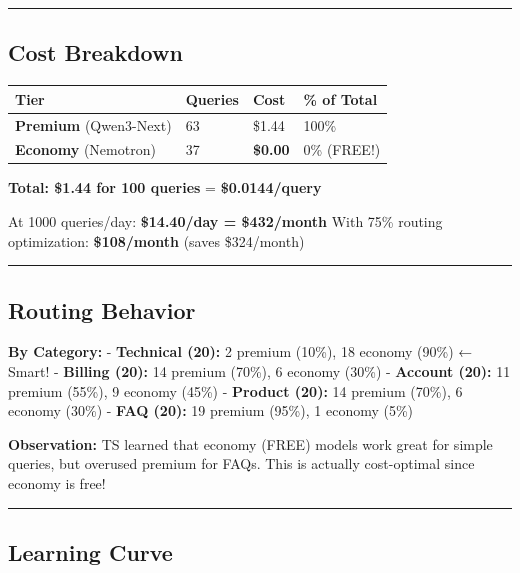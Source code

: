 \documentclass[
  11pt,
]{article}
\begin{document}
\begin{center}\rule{0.5\linewidth}{0.5pt}\end{center}

\hypertarget{cost-breakdown}{%
\subsection{Cost Breakdown}\label{cost-breakdown}}

\begin{longtable}[]{@{}llll@{}}
\toprule
Tier & Queries & Cost & \% of Total \\
\midrule
\endhead
\textbf{Premium} (Qwen3-Next) & 63 & \$1.44 & 100\% \\
\textbf{Economy} (Nemotron) & 37 & \textbf{\$0.00} & 0\% (FREE!) \\
\bottomrule
\end{longtable}

\textbf{Total: \$1.44 for 100 queries} = \textbf{\$0.0144/query}

At 1000 queries/day: \textbf{\$14.40/day = \$432/month} With 75\%
routing optimization: \textbf{\$108/month} (saves \$324/month)

\begin{center}\rule{0.5\linewidth}{0.5pt}\end{center}

\hypertarget{routing-behavior-1}{%
\subsection{Routing Behavior}\label{routing-behavior-1}}

\textbf{By Category:} - \textbf{Technical (20):} 2 premium (10\%), 18
economy (90\%) ← Smart! - \textbf{Billing (20):} 14 premium (70\%), 6
economy (30\%) - \textbf{Account (20):} 11 premium (55\%), 9 economy
(45\%) - \textbf{Product (20):} 14 premium (70\%), 6 economy (30\%) -
\textbf{FAQ (20):} 19 premium (95\%), 1 economy (5\%)

\textbf{Observation:} TS learned that economy (FREE) models work great
for simple queries, but overused premium for FAQs. This is actually
cost-optimal since economy is free!

\begin{center}\rule{0.5\linewidth}{0.5pt}\end{center}

\hypertarget{learning-curve}{%
\subsection{Learning Curve}\label{learning-curve}}
\end{document}
